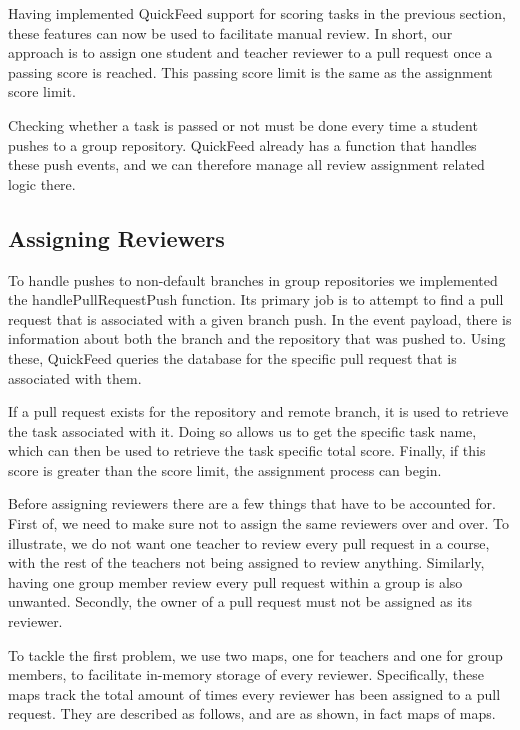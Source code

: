 Having implemented QuickFeed support for scoring tasks in the previous section, these features can now be used to facilitate manual review.
In short, our approach is to assign one student and teacher reviewer to a pull request once a passing score is reached.
This passing score limit is the same as the assignment score limit.

Checking whether a task is passed or not must be done every time a student pushes to a group repository.
QuickFeed already has a function that handles these push events, and we can therefore manage all review assignment related logic there.

\subsection{Assigning Reviewers}
\label{sec:assigning-reviewers}

To handle pushes to non-default branches in group repositories we implemented the handlePullRequestPush function.
Its primary job is to attempt to find a pull request that is associated with a given branch push.
In the event payload, there is information about both the branch and the repository that was pushed to.
Using these, QuickFeed queries the database for the specific pull request that is associated with them.

If a pull request exists for the repository and remote branch, it is used to retrieve the task associated with it.
Doing so allows us to get the specific task name, which can then be used to retrieve the task specific total score.
Finally, if this score is greater than the score limit, the assignment process can begin.

Before assigning reviewers there are a few things that have to be accounted for.
First of, we need to make sure not to assign the same reviewers over and over.
To illustrate, we do not want one teacher to review every pull request in a course, with the rest of the teachers not being assigned to review anything.
Similarly, having one group member review every pull request within a group is also unwanted.
Secondly, the owner of a pull request must not be assigned as its reviewer.

To tackle the first problem, we use two maps, one for teachers and one for group members, to facilitate in-memory storage of every reviewer.
Specifically, these maps track the total amount of times every reviewer has been assigned to a pull request.
They are described as follows, and are as shown, in fact maps of maps.

